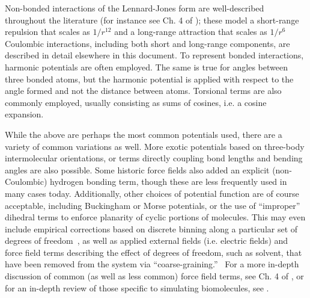 \documentclass[9pt,bestpractices]{livecoms}
\begin{document}
Non-bonded interactions of the Lennard-Jones form are well-described throughout the literature (for instance see Ch. 4 of \citet{LeachBook}); these model a short-range repulsion that scales as $1/r^{12}$ and a long-range attraction that scales as $1/r^6$ 
Coulombic interactions, including both short and long-range components, are described in detail elsewhere in this document.
To represent bonded interactions, harmonic potentials are often employed. 
The same is true for angles between three bonded atoms, but the harmonic potential is applied with respect to the angle formed and not the distance between atoms. 
Torsional terms are also commonly employed, usually consisting as sums of cosines, i.e. a cosine expansion.

While the above are perhaps the most common potentials used, there are a variety of common variations as well.
More exotic potentials based on three-body intermolecular orientations, or terms directly coupling bond lengths and bending angles are also possible.
Some historic force fields also added an explicit (non-Coulombic) hydrogen bonding term, though these are less frequently used in many cases today.
Additionally, other choices of potential function are of course acceptable, including Buckingham or Morse potentials, or the use of ``improper'' dihedral terms to enforce planarity of cyclic portions of molecules. 
This may even include empirical corrections based on discrete binning along a particular set of degrees of freedom~\citep{mackerell2004CMAP, perez2015}, as well as applied external fields (i.e. electric fields) and force field terms describing the effect of degrees of freedom, such as solvent, that have been removed from the system via ``coarse-graining.''~\citep{sanyal2016}
For a more in-depth discussion of common (as well as less common) force field terms, see Ch. 4 of \citet{LeachBook}, or for an in-depth review of those specific to simulating biomolecules, see \citet{Ponder2003}.
\end{document}
